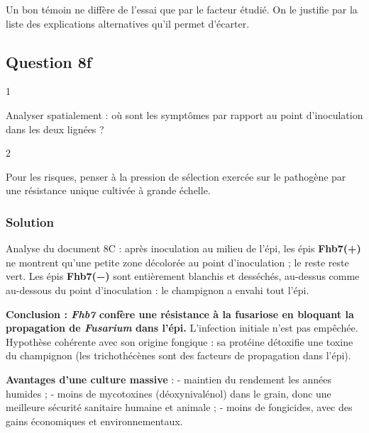 \documentclass[11pt,a4paper]{article}
\begin{document}
\begin{methode}

Un bon témoin ne diffère de l'essai que par le facteur étudié. On le justifie par la liste des explications alternatives qu'il permet d'écarter.

\end{methode}

\hypertarget{question-8f}{%
\subsection{Question 8f}\label{question-8f}}

\begin{indication}{1}

Analyser spatialement : où sont les symptômes par rapport au point d'inoculation dans les deux lignées ?

\end{indication}

\begin{indication}{2}

Pour les risques, penser à la pression de sélection exercée sur le pathogène par une résistance unique cultivée à grande échelle.

\end{indication}

\hypertarget{solution-25}{%
\subsubsection{Solution}\label{solution-25}}

Analyse du document 8C : après inoculation au milieu de l'épi, les épis \textbf{Fhb7(+)} ne montrent qu'une petite zone décolorée au point d'inoculation ; le reste reste vert. Les épis \textbf{Fhb7(−)} sont entièrement blanchis et desséchés, au-dessus comme au-dessous du point d'inoculation : le champignon a envahi tout l'épi.

\textbf{Conclusion : \emph{Fhb7} confère une résistance à la fusariose en bloquant la propagation de \emph{Fusarium} dans l'épi.} L'infection initiale n'est pas empêchée. Hypothèse cohérente avec son origine fongique : sa protéine détoxifie une toxine du champignon (les trichothécènes sont des facteurs de propagation dans l'épi).

\textbf{Avantages d'une culture massive} :
- maintien du rendement les années humides ;
- moins de mycotoxines (déoxynivalénol) dans le grain, donc une meilleure sécurité sanitaire humaine et animale ;
- moins de fongicides, avec des gains économiques et environnementaux.
\end{document}
